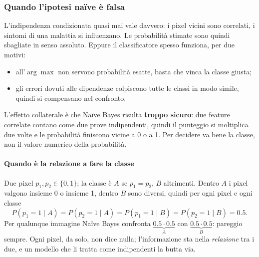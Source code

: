\documentclass[12pt]{extarticle}
\begin{document}
\subsubsection{Quando l'ipotesi naïve è falsa}

\noindent L'indipendenza condizionata quasi mai vale davvero: i pixel vicini sono correlati, i sintomi di una malattia si influenzano. Le probabilità stimate sono quindi sbagliate in senso assoluto. Eppure il classificatore spesso funziona, per due motivi:
\begin{itemize}
    \item all'$\arg\max$ non servono probabilità esatte, basta che vinca la classe giusta;
    \item gli errori dovuti alle dipendenze colpiscono tutte le classi in modo simile, quindi si compensano nel confronto.
\end{itemize}
L'effetto collaterale è che Naïve Bayes risulta \textbf{troppo sicuro}: due feature correlate contano come due prove indipendenti, quindi il punteggio si moltiplica due volte e le probabilità finiscono vicine a 0 o a 1. Per decidere va bene la classe, non il valore numerico della probabilità.

\paragraph{Quando è la relazione a fare la classe}
Due pixel $p_1,p_2\in\{0,1\}$; la classe è $A$ se $p_1=p_2$, $B$ altrimenti. Dentro $A$ i pixel valgono insieme 0 o insieme 1, dentro $B$ sono diversi, quindi per ogni pixel e ogni classe
\[
P(p_1=1\mid A)=P(p_2=1\mid A)=P(p_1=1\mid B)=P(p_2=1\mid B)=0.5 .
\]
Per qualunque immagine Naïve Bayes confronta $\underbrace{0.5\cdot0.5}_{A}$ con $\underbrace{0.5\cdot0.5}_{B}$: pareggio sempre. Ogni pixel, da solo, non dice nulla; l'informazione sta nella \emph{relazione} tra i due, e un modello che li tratta come indipendenti la butta via.

\begin{center}
\end{center}
\end{document}
